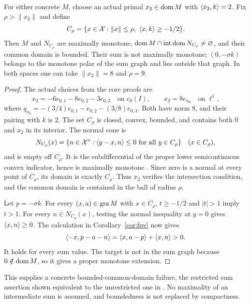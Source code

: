 \begin{corollary}\label{cor:normal}
For either concrete $M$, choose an actual primal $x_2\in\operatorname{dom} M$ with
$\langle x_2,k\rangle=2$. Fix $\rho>\|x_2\|$ and define
\begin{equation}
C_\rho=\{x\in\mathcal X:\|x\|\le\rho,\ \langle x,k\rangle\ge-1/2\}.
\label{eq:cor-cut}
\end{equation}
Then $M$ and $N_{C_\rho}$ are maximally monotone,
$\operatorname{dom} M\cap\operatorname{int}\operatorname{dom} N_{C_\rho}\ne\varnothing$, and
their common domain is bounded. Their sum is not maximally monotone;
$(0,-\sigma k)$ belongs to the monotone polar of the sum graph
and lies outside that graph.
In both spaces one can take $\|x_2\|=8$ and $\rho=9$.
\end{corollary}
\begin{proof}
The actual choices from the core proofs are
\[
x_2=-6e_{0,1}-8e_{0,2}-3e_{0,3}\quad\text{on }c_0(I),
\qquad x_2=8e_{n_0}\quad\text{on }\ell^1,
\]
where $q_{n_0}=-(3/4)e_{0,1}-e_{0,2}-(3/8)e_{0,3}$. Both have norm
$8$, and their pairing with $k$ is $2$. The set $C_\rho$ is closed,
convex, bounded, and contains both $0$ and
$x_2$ in its interior. The normal cone is
\[
N_{C_\rho}(x)=\{n\in\mathcal X^*:
\langle y-x,n\rangle\le0\ \text{for all }y\in C_\rho\}
\quad(x\in C_\rho),
\]
and is empty off $C_\rho$. It is the subdifferential of the proper
lower semicontinuous convex indicator, hence is maximally monotone
\cite[Theorem~A]{rockafellar1970subdiff}. Since zero is a normal at
every point of $C_\rho$, its domain is exactly $C_\rho$.
Thus $x_2$ verifies the intersection condition, and the common domain
is contained in the ball of radius $\rho$.

Let $p=-\sigma k$. For every $(x,a)\in\operatorname{gra} M$ with $x\in C_\rho$,
$t\ge-1/2$ and $|t|>1$ imply $t>1$. For every $n\in N_{C_\rho}(x)$,
testing the normal inequality at $y=0$ gives $\langle x,n\rangle\ge0$.
The calculation in Corollary~\ref{cor:fpv} now gives
\[
\langle -x,p-a-n\rangle=\langle x,a-p\rangle+\langle x,n\rangle>0.
\]
It holds for every sum value. The target is not in the sum graph because
$0\notin\operatorname{dom} M$, so it gives a proper monotone extension.
\end{proof}
This supplies a concrete bounded-common-domain failure, the restricted
sum assertion shown equivalent to the unrestricted one in
\cite[Theorem~2]{botbuenosimons2016}. No maximality of an intermediate
sum is assumed, and boundedness is not replaced by compactness.

